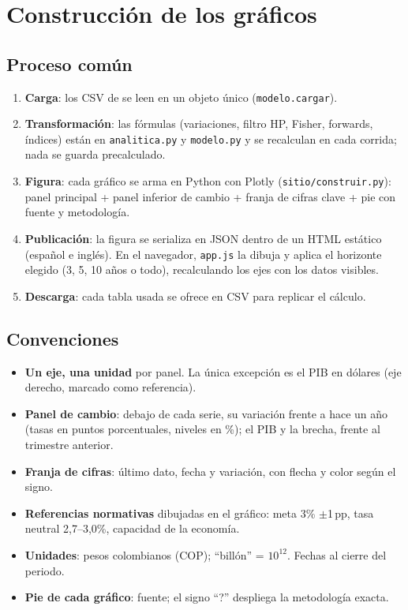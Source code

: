 \documentclass[11pt]{article}
\begin{document}
\section{Construcción de los gráficos}
\label{sec:construccion}

\subsection{Proceso común}
\begin{enumerate}
\item \textbf{Carga}: los CSV de  se leen en un objeto único (\texttt{modelo.cargar}).
\item \textbf{Transformación}: las fórmulas (variaciones, filtro HP, Fisher, forwards, índices) están en
\texttt{analitica.py} y \texttt{modelo.py} y se recalculan en cada corrida; nada se guarda precalculado.
\item \textbf{Figura}: cada gráfico se arma en Python con Plotly (\texttt{sitio/construir.py}): panel principal +
panel inferior de cambio + franja de cifras clave + pie con fuente y metodología.
\item \textbf{Publicación}: la figura se serializa en JSON dentro de un HTML estático (español e inglés). En el
navegador, \texttt{app.js} la dibuja y aplica el horizonte elegido (3, 5, 10 años o todo), recalculando los
ejes con los datos visibles.
\item \textbf{Descarga}: cada tabla usada se ofrece en CSV para replicar el cálculo.
\end{enumerate}

\subsection{Convenciones}
\begin{itemize}
\item \textbf{Un eje, una unidad} por panel. La única excepción es el PIB en dólares (eje derecho, marcado como referencia).
\item \textbf{Panel de cambio}: debajo de cada serie, su variación frente a hace un año (tasas en puntos
porcentuales, niveles en \%); el PIB y la brecha, frente al trimestre anterior.
\item \textbf{Franja de cifras}: último dato, fecha y variación, con flecha y color según el signo.
\item \textbf{Referencias normativas} dibujadas en el gráfico: meta 3\% $\pm$1\,pp, tasa neutral 2,7–3,0\%,
capacidad de la economía.
\item \textbf{Unidades}: pesos colombianos (COP); “billón” = $10^{12}$. Fechas al cierre del periodo.
\item \textbf{Pie de cada gráfico}: fuente; el signo “?” despliega la metodología exacta.
\end{itemize}
\end{document}
